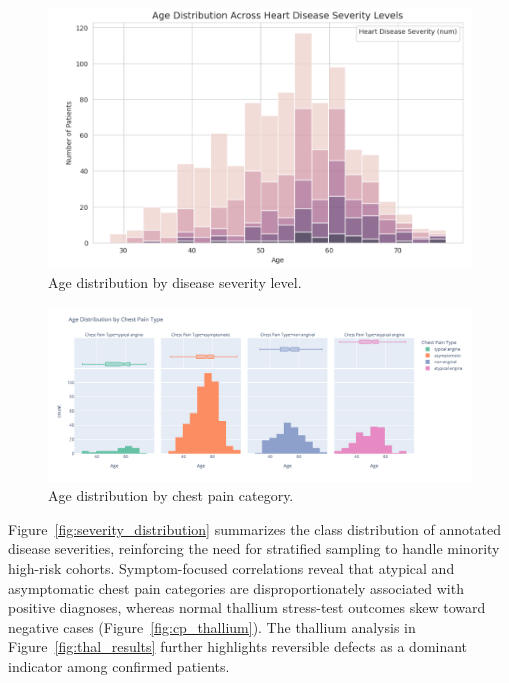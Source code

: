 \documentclass[conference]{IEEEtran}
\begin{document}
\begin{figure}[t]
  \centering
  \includegraphics[width=0.85\linewidth]{age_distribution_by_severity_levels.png}
  \caption{Age distribution by disease severity level.}
  \label{fig:age_severity}
\end{figure}

\begin{figure}[t]
  \centering
  \includegraphics[width=0.85\linewidth]{age_distribution_by_chest_pain_type.png}
  \caption{Age distribution by chest pain category.}
  \label{fig:age_cp}
\end{figure}

Figure~\ref{fig:severity_distribution} summarizes the class distribution of annotated disease severities, reinforcing the need for stratified sampling to handle minority high-risk cohorts. Symptom-focused correlations reveal that atypical and asymptomatic chest pain categories are disproportionately associated with positive diagnoses, whereas normal thallium stress-test outcomes skew toward negative cases (Figure~\ref{fig:cp_thallium}). The thallium analysis in Figure~\ref{fig:thal_results} further highlights reversible defects as a dominant indicator among confirmed patients.
\end{document}
